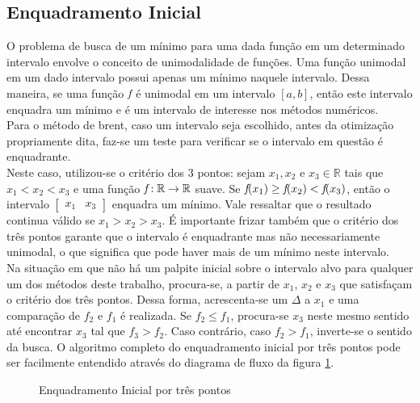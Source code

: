 \documentclass[a4paper,12pt,utf8x,notitlepage]{article}
\begin{document}
\subsection{Enquadramento Inicial}

\vspace{0.5cm}

O problema de busca de um mínimo para uma dada função em um determinado intervalo envolve o conceito de unimodalidade de funções. Uma função unimodal em um dado intervalo possui apenas um mínimo naquele intervalo. Dessa maneira, se uma função $\emph{f}$ é unimodal em um intervalo $[a,b]$, então este intervalo enquadra um mínimo e é um intervalo de interesse nos métodos numéricos.\\

Para o método de brent, caso um intervalo seja escolhido, antes da otimização propriamente dita, faz-se um teste para verificar se o intervalo em questão é enquadrante. \\

Neste caso, utilizou-se o critério dos 3 pontos: sejam $x_1, x_2$ e $x_3 \in \mathbb{R}$ tais que $x_1 < x_2 < x_3$ e uma função $\emph{f}:  \mathbb{R} \rightarrow  \mathbb{R}$ suave. Se $\emph{f} (x_1)\geq\emph{f} (x_2)< \emph{f} (x_3)$, então o intervalo $\begin{bmatrix}x_1 & x_3\end{bmatrix}$ enquadra um mínimo. Vale ressaltar que o resultado continua válido se $x_1 > x_2 > x_3$. É importante frizar também que o critério dos três pontos garante que o intervalo é enquadrante mas não necessariamente unimodal, o que significa que pode haver mais de um mínimo neste intervalo.\\

Na situação em que não há um palpite inicial sobre o intervalo alvo para qualquer um dos métodos deste trabalho, procura-se, a partir de $x_1$, $x_2$ e $x_3$ que satisfaçam o critério dos três pontos. Dessa forma, acrescenta-se um $\Delta$ a $x_1$ e uma comparação de $f_2$ e $f_1$ é realizada. Se $f_2 \leq f_1$, procura-se $x_3$ neste mesmo sentido até encontrar $x_3$ tal que $f_3 > f_2$. Caso contrário, caso $f_2>f_1$, inverte-se o sentido da busca. O algoritmo completo do enquadramento inicial por três pontos pode ser facilmente entendido através do diagrama de fluxo da figura \ref{fig:enq}.\\

\begin{figure}[!h]
\centering
\scalebox{.85}{}
\caption{Enquadramento Inicial por três pontos}
\label{fig:enq}
\end{figure}
\end{document}
